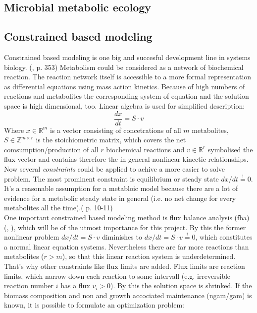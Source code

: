 \subsection{Microbial metabolic ecology}

\subsection{Constrained based modeling}
Constrained based modeling is one big and succesful development line in systems biology. (\cite{Esvelt2013}, \cite{Klipp2010} p. 353)
Metabolism could be considered as a network of biochemical reaction.
The reaction network itself is accessible to a more formal representation as differential equations using mass action kinetics.
Because of high numbers of reactions and metabolites the corresponding system of equation and the solution space is high dimensional, too.
Linear algebra is used for simplified description:
\[
  \frac{dx}{dt}=S \cdot v
\]
Where $x\in \mathbb{R}^m$ is a vector consisting of concetrations of all $m$ metabolites, $S\in \mathbb{Z}^{m\times r}$ is the stoichiometric matrix, which covers the net comsumption/production of all $r$ biochemical reactions and $v \in \mathbb{R}^r$ symbolised the flux vector and contains therefore the in general nonlinear kinectic relationships.\\
Now several \textit{constraints} could be applied to achive a more easier to solve problem.
The most prominent constraint is equilibrium or steady state $dx/dt \stackrel{!}{=}0$.
It's a reasonable assumption for a metabloic model because there are a lot of evidence for a metabolic steady state in general (i.e. no net change for every metabolites all the time).(\cite{Harris1995} p. 10-11)\\
One important constrained based modeling method is flux balance analysis (fba) (\cite{Varma1994}, \cite{Orth2010}), which will be of the utmost importance for this project.
By this the former nonlinear problem $dx/dt=S\cdot v$ diminishes to $dx/dt=S\cdot v \stackrel{!}{=}0$, which constitutes a normal linear equation systems.
Nevertheless there are far more reactions than metabolites ($r>m$), so that this linear reaction system is underdetermined.
That's why other constraints like flux limits are added.
Flux limits are reaction limits, which narrow down each reaction to some intervall (e.g. irreversible reaction number $i$ has a flux $v_i>0$).
By this the solution space is shrinked.
If the biomass composition and non and growth accociated maintenance (ngam/gam) is known, it is possible to formulate an optimization problem:

